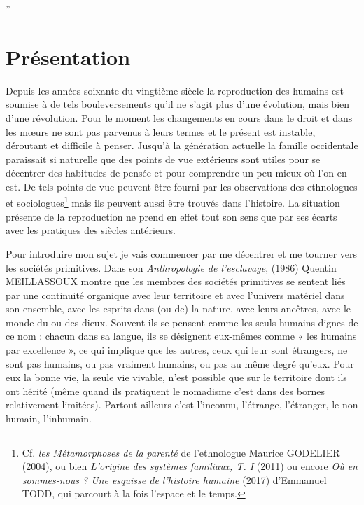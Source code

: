 

”\chapter{Présentation}









Depuis les années soixante du vingtième siècle la reproduction des humains est soumise à de tels bouleversements qu'il ne s'agit plus d'une évolution, mais bien d'une révolution. Pour le moment les changements en cours dans le droit et dans les mœurs ne sont pas parvenus à leurs termes et le présent est instable, déroutant et difficile à penser. Jusqu'à la génération actuelle la famille occidentale paraissait si naturelle que des points de vue extérieurs sont utiles pour se décentrer des habitudes de pensée et pour comprendre un peu mieux où l'on en est. 
De tels points de vue peuvent être fourni par les observations des ethnologues et sociologues\footnote{Cf. \emph{les Métamorphoses de la parenté} de l'ethnologue Maurice GODELIER (2004), ou bien \emph{L'origine des systèmes familiaux, T. I} (2011) ou encore \emph{Où en sommes-nous ? Une esquisse de l'histoire humaine} (2017) d'Emmanuel TODD, qui parcourt à la fois l'espace et le temps.} mais ils peuvent aussi être trouvés dans l'histoire. La situation présente de la reproduction ne prend en effet tout son sens que par ses écarts avec les pratiques des siècles antérieurs.
 
 Pour introduire mon sujet je vais commencer par me décentrer et me tourner vers les sociétés primitives. 
 Dans son \emph{Anthropologie de l’esclavage}, (1986) Quentin MEILLASSOUX montre que les membres des sociétés primitives se sentent liés par une continuité organique avec leur territoire et avec l'univers matériel dans son ensemble, avec les esprits dans (ou de) la nature, avec leurs ancêtres, avec le monde du ou des dieux. Souvent ils se pensent comme les seuls humains dignes de ce nom : chacun dans sa langue, ils se désignent eux-mêmes comme « les humains par excellence », ce qui implique que les autres, ceux qui leur sont étrangers, ne sont pas humains, ou pas vraiment humains, ou pas au même degré qu’eux. Pour eux la bonne vie, la seule vie vivable, n'est possible que sur le territoire dont ils ont hérité (même quand ils pratiquent le nomadisme c'est dans des bornes relativement limitées). Partout ailleurs c'est l'inconnu, l'étrange, l'étranger, le non humain, l'inhumain.

